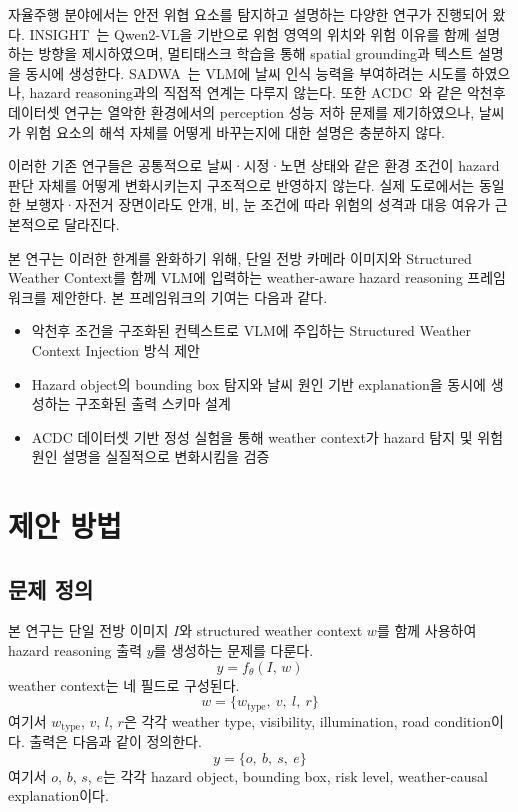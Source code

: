 \documentclass[a4paper,10pt]{article}
\begin{document}
자율주행 분야에서는 안전 위협 요소를 탐지하고 설명하는 다양한 연구가 진행되어 왔다. INSIGHT~\cite{insight2026}는 Qwen2-VL을 기반으로 위험 영역의 위치와 위험 이유를 함께 설명하는 방향을 제시하였으며, 멀티태스크 학습을 통해 spatial grounding과 텍스트 설명을 동시에 생성한다. SADWA~\cite{sadwa2025}는 VLM에 날씨 인식 능력을 부여하려는 시도를 하였으나, hazard reasoning과의 직접적 연계는 다루지 않는다. 또한 ACDC~\cite{acdc2021}와 같은 악천후 데이터셋 연구는 열악한 환경에서의 perception 성능 저하 문제를 제기하였으나, 날씨가 위험 요소의 해석 자체를 어떻게 바꾸는지에 대한 설명은 충분하지 않다.

이러한 기존 연구들은 공통적으로 날씨·시정·노면 상태와 같은 환경 조건이 hazard 판단 자체를 어떻게 변화시키는지 구조적으로 반영하지 않는다. 실제 도로에서는 동일한 보행자·자전거 장면이라도 안개, 비, 눈 조건에 따라 위험의 성격과 대응 여유가 근본적으로 달라진다.

본 연구는 이러한 한계를 완화하기 위해, 단일 전방 카메라 이미지와 Structured Weather Context를 함께 VLM에 입력하는 weather-aware hazard reasoning 프레임워크를 제안한다. 본 프레임워크의 기여는 다음과 같다.

\begin{itemize}
  \setlength{\itemsep}{0pt}
  \item 악천후 조건을 구조화된 컨텍스트로 VLM에 주입하는 Structured Weather Context Injection 방식 제안
  \item Hazard object의 bounding box 탐지와 날씨 원인 기반 explanation을 동시에 생성하는 구조화된 출력 스키마 설계
  \item ACDC 데이터셋 기반 정성 실험을 통해 weather context가 hazard 탐지 및 위험 원인 설명을 실질적으로 변화시킴을 검증
\end{itemize}

\section{제안 방법}

\subsection{문제 정의}

본 연구는 단일 전방 이미지 $I$와 structured weather context $w$를 함께 사용하여 hazard reasoning 출력 $y$를 생성하는 문제를 다룬다.
%
\begin{equation}
  y = f_{\theta}(I,\, w)
\end{equation}
%
weather context는 네 필드로 구성된다.
%
\begin{equation}
  w = \{w_{\text{type}},\ v,\ l,\ r\}
\end{equation}
%
여기서 $w_{\text{type}}$, $v$, $l$, $r$은 각각 weather type, visibility, illumination, road condition이다. 출력은 다음과 같이 정의한다.
%
\begin{equation}
  y = \{o,\ b,\ s,\ e\}
\end{equation}
%
여기서 $o$, $b$, $s$, $e$는 각각 hazard object, bounding box, risk level, weather-causal explanation이다.
\end{document}
